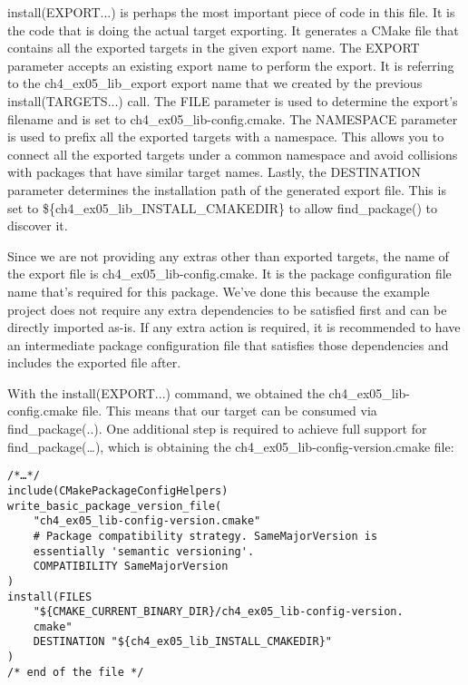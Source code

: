 install(EXPORT...) is perhaps the most important piece of code in this file. It is the code that is doing the actual target exporting. It generates a CMake file that contains all the exported targets in the given export name. The EXPORT parameter accepts an existing export name to perform the export. It is referring to the ch4\_ex05\_lib\_export export name that we created by the previous install(TARGETS...) call. The FILE parameter is used to determine the export's filename and is set to ch4\_ex05\_lib-config.cmake. The NAMESPACE parameter is used to prefix all the exported targets with a namespace. This allows you to connect all the exported targets under a common namespace and avoid collisions with packages that have similar target names. Lastly, the DESTINATION parameter determines the installation path of the generated export file. This is set to \$\{ch4\_ex05\_lib\_INSTALL\_CMAKEDIR\} to allow find\_package() to discover it.

\begin{tcolorbox}[colback=webgreen!5!white,colframe=webgreen!75!black,title=Note]
Since we are not providing any extras other than exported targets, the name of the export file is ch4\_ex05\_lib-config.cmake. It is the package configuration file name that's required for this package. We've done this because the example project does not require any extra dependencies to be satisfied first and can be directly imported as-is. If any extra action is required, it is recommended to have an intermediate package configuration file that satisfies those dependencies and includes the exported file after.
\end{tcolorbox}

With the install(EXPORT...) command, we obtained the ch4\_ex05\_lib-config.cmake file. This means that our target can be consumed via find\_package(..). One additional step is required to achieve full support for find\_package(…), which is obtaining the ch4\_ex05\_lib-config-version.cmake file:

\begin{lstlisting}[style=styleCMake]
/*…*/
include(CMakePackageConfigHelpers)
write_basic_package_version_file(
	"ch4_ex05_lib-config-version.cmake"
	# Package compatibility strategy. SameMajorVersion is
	essentially 'semantic versioning'.
	COMPATIBILITY SameMajorVersion
)
install(FILES
	"${CMAKE_CURRENT_BINARY_DIR}/ch4_ex05_lib-config-version.
	cmake"
	DESTINATION "${ch4_ex05_lib_INSTALL_CMAKEDIR}"
)
/* end of the file */
\end{lstlisting}

